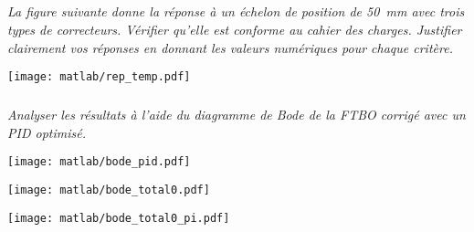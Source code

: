 \begin{multicols}{2}
\subparagraph{}\textit{La figure suivante %
donne la réponse à un échelon de position de \SI{50}{mm} avec trois types de correcteurs. Vérifier qu'elle est conforme au cahier des charges. Justifier clairement vos réponses en donnant les valeurs numériques pour chaque critère.}


\begin{center}
\texttt{[image: matlab/rep\_temp.pdf]}
\end{center}


\subparagraph{}\textit{Analyser les résultats à l'aide du diagramme de Bode de la FTBO corrigé avec un PID optimisé.}%

\begin{center}
\texttt{[image: matlab/bode\_pid.pdf]}
\end{center}


\begin{center}
\texttt{[image: matlab/bode\_total0.pdf]}
\end{center}

\begin{center}
\texttt{[image: matlab/bode\_total0\_pi.pdf]}
\end{center}
%


\end{multicols}


